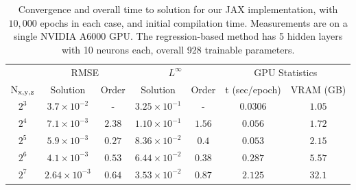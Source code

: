 \documentclass{elsarticle}
\begin{document}
\begin{table}[ht]
\begin{center}
\caption{Convergence and overall time to solution for our JAX implementation, with $10,000$ epochs in each case, and initial compilation time. Measurements are on a single NVIDIA A6000 GPU. The regression-based method has 5 hidden layers with 10 neurons each, overall 928 trainable parameters.} \label{tab:convergence_sphere}

\begin{tabular}{ccccccc}
\toprule
 & \multicolumn{2}{c}{RMSE}& \multicolumn{2}{c}{$L^\infty$} & \multicolumn{2}{c}{GPU Statistics} \\
\cmidrule(r){2-3}\cmidrule(r){4-5}\cmidrule(r){6-7}
$\rm N_{x,y,z}$   &   Solution    &   Order   &   Solution   &   Order & t (sec/epoch) & VRAM (GB)\\
\midrule
$2^3$ & $3.7\times 10^{-2}$ &  -        & $3.25\times 10^{-1}$  &   -     & $0.0306$ & $1.05$ \\
$2^4$ & $7.1\times 10^{-3}$ &  $2.38$   & $1.10\times 10^{-1}$   & $1.56$  & $0.056$  & $1.72$ \\ 
$2^5$ & $5.9\times 10^{-3}$ &  $0.27$   & $8.36 \times 10^{-2}$ & $0.4$   & $0.053$  & $2.15$ \\ 
$2^6$ & $4.1\times 10^{-3}$ &  $0.53$   & $6.44\times 10^{-2}$  & $0.38$  & $0.287$  & $5.57$ \\ 
$2^7$ & $2.64\times 10^{-3}$&  $0.64$   & $3.53\times 10^{-2}$  & $0.87$  & $2.125$ & $32.1$ \\ \bottomrule
\end{tabular}
\end{center}
\end{table}
\end{document}
